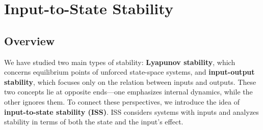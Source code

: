 \chapterspaceabove{6.75cm} %
\chapterspacebelow{7.25cm} %

\chapter{Input-to-State Stability}

\section{Overview}
We have studied two main types of stability: \textbf{Lyapunov stability}, which concerns equilibrium points of unforced state-space systems, and \textbf{input-output stability}, which focuses only on the relation between inputs and outputs. These two concepts lie at opposite ends---one emphasizes internal dynamics, while the other ignores them. To connect these perspectives, we introduce the idea of \textbf{input-to-state stability (ISS)}. ISS considers systems with inputs and analyzes stability in terms of both the state and the input’s effect.
